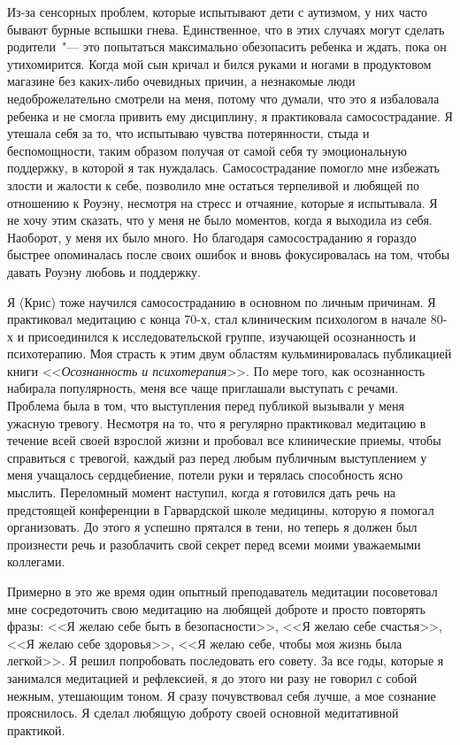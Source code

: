 	Из-за сенсорных проблем, которые испытывают дети с аутизмом, у них часто бывают бурные вспышки гнева. Единственное, что в этих случаях могут сделать родители~"--- это попытаться максимально обезопасить ребенка и ждать, пока он утихомирится. Когда мой сын кричал и бился руками и ногами в продуктовом магазине без каких-либо очевидных причин, а незнакомые люди недоброжелательно смотрели на меня, потому что думали, что это я избаловала ребенка и не смогла привить ему дисциплину, я практиковала самосострадание. Я утешала себя за то, что испытываю чувства потерянности, стыда и беспомощности, таким образом получая от самой себя ту эмоциональную поддержку, в которой я так нуждалась. Самосострадание помогло мне избежать злости и жалости к себе, позволило мне остаться терпеливой и любящей по отношению к Роуэну, несмотря на стресс и отчаяние, которые я испытывала. Я не хочу этим сказать, что у меня не было моментов, когда я выходила из себя. Наоборот, у меня их было много. Но благодаря самосостраданию я гораздо быстрее опоминалась после своих ошибок и вновь фокусировалась на том, чтобы давать Роуэну любовь и поддержку.
	
	Я (Крис) тоже научился самосостраданию в основном по личным причинам. Я практиковал медитацию с конца 70-х, стал клиническим психологом в начале 80-х и присоединился к исследовательской группе, изучающей осознанность и психотерапию. Моя страсть к этим двум областям  кульминировалась публикацией книги <<\emph{Осознанность и психотерапия}>>. По мере того, как осознанность набирала популярность, меня все чаще приглашали выступать с речами. Проблема была в том, что выступления перед публикой вызывали у меня ужасную тревогу. Несмотря на то, что я регулярно практиковал медитацию в течение всей своей взрослой жизни и пробовал все клинические приемы, чтобы справиться с тревогой, каждый раз перед любым публичным выступлением у меня учащалось сердцебиение, потели руки и терялась способность ясно мыслить. Переломный момент наступил, когда я готовился дать речь на предстоящей конференции в Гарвардской школе медицины, которую я помогал организовать. До этого я успешно прятался в тени, но теперь я должен был произнести речь и разоблачить свой секрет перед всеми моими уважаемыми коллегами.
	
	Примерно в это же время один опытный преподаватель медитации посоветовал мне сосредоточить свою медитацию на любящей доброте и просто повторять фразы: <<Я желаю себе быть в безопасности>>, <<Я желаю себе счастья>>, <<Я желаю себе здоровья>>, <<Я желаю себе, чтобы моя жизнь была легкой>>. Я решил попробовать последовать его совету. За все годы, которые я занимался медитацией и рефлексией, я до этого ни разу не говорил с собой нежным, утешающим тоном. Я сразу почувствовал себя лучше, а мое сознание прояснилось. Я сделал любящую доброту своей основной медитативной практикой. 
	
